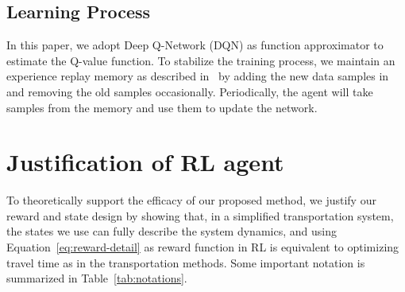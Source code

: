 \vspace{-1mm}
\subsection{Learning Process}






In this paper, we adopt Deep Q-Network (DQN) as function approximator to estimate the Q-value function. To stabilize the training process, we maintain an experience replay memory as described in~\cite{MKSR+15} by adding the new data samples in and removing the old samples occasionally. Periodically, the agent will take samples from the memory and use them to update the network.


\section{Justification of RL agent}
To theoretically support the efficacy of our proposed method, we justify our reward and state design by showing that, in a simplified transportation system, the states we use can fully describe the system dynamics, and using Equation~\eqref{eq:reward-detail} as reward function in RL is equivalent to optimizing travel time as in the transportation methods. Some important notation is summarized in Table~\ref{tab:notations}.
\vspace{-3mm}

